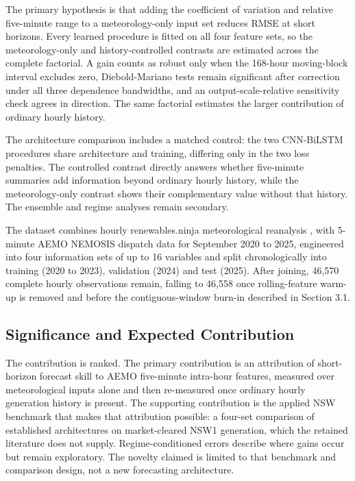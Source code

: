 The primary hypothesis is that adding the coefficient of variation and relative five-minute range to a meteorology-only input set reduces RMSE at short horizons. Every learned procedure is fitted on all four feature sets, so the meteorology-only and history-controlled contrasts are estimated across the complete factorial. A gain counts as robust only when the 168-hour moving-block interval excludes zero, Diebold-Mariano tests remain significant after correction under all three dependence bandwidths, and an output-scale-relative sensitivity check agrees in direction. The same factorial estimates the larger contribution of ordinary hourly history.

The architecture comparison includes a matched control: the two CNN-\allowbreak{}BiLSTM procedures share architecture and training, differing only in the two loss penalties. The controlled contrast directly answers whether five-minute summaries add information beyond ordinary hourly history, while the meteorology-only contrast shows their complementary value without that history. The ensemble and regime analyses remain secondary.

The dataset combines hourly renewables.ninja meteorological reanalysis \cite{pfenninger2016longterm}, \cite{renewables2025api} with 5-minute AEMO NEMOSIS dispatch data \cite{aemo2024nemosis} for September 2020 to 2025, engineered into four information sets of up to 16 variables and split chronologically into training (2020 to 2023), validation (2024) and test (2025). After joining, 46,570 complete hourly observations remain, falling to 46,558 once rolling-feature warm-up is removed and before the contiguous-window burn-in described in Section 3.1.

\subsection{Significance and Expected Contribution}

The contribution is ranked. The primary contribution is an attribution of short-horizon forecast skill to AEMO five-minute intra-hour features, measured over meteorological inputs alone and then re-measured once ordinary hourly generation history is present. The supporting contribution is the applied NSW benchmark that makes that attribution possible: a four-set comparison of established architectures on market-cleared NSW1 generation, which the retained literature does not supply. Regime-conditioned errors describe where gains occur but remain exploratory. The novelty claimed is limited to that benchmark and comparison design, not a new forecasting architecture.

